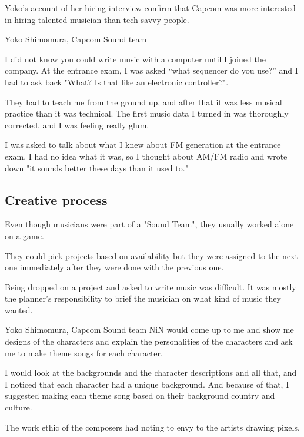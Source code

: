 Yoko's account of her hiring interview confirm that Capcom was more interested in hiring talented musician than tech savvy people.

\begin{q}{Yoko Shimomura, Capcom Sound team\cite{beep199010}}
  
I did not know you could write music with a computer until I joined the company. At the entrance exam, I was asked “what sequencer do you use?” and I had to ask back "What? Is that like an electronic controller?".

They had to teach me from the ground up, and after that it was less musical practice than it was technical. The first music data I turned in was thoroughly corrected, and I was feeling really glum.

I was asked to talk about what I knew about FM generation at the entrance exam. I had no idea what it was, so I thought about AM/FM radio and wrote down "it sounds better these days than it used to."
\end{q}



\subsection{Creative process}
Even though musicians were part of a "Sound Team", they usually worked alone on a game. 

They could pick projects based on availability\cite{sf2musics} but they were assigned to the next one immediately after they were done with the previous one.


Being dropped on a project and asked to write music was difficult. It was mostly the planner's responsibility to brief the musician on what kind of music they wanted\cite{sf2_music}.

\begin{q}{Yoko Shimomura, Capcom Sound team\cite{sf2_oral_history}}
NiN would come up to me and show me designs of the characters and explain the personalities of the characters and ask me to make theme songs for each character.

I would look at the backgrounds and the character descriptions and all that, and I noticed that each character had a unique background. And because of that, I suggested making each theme song based on their background country and culture.
\end{q}

The work ethic of the composers had noting to envy to the artists drawing pixels.


